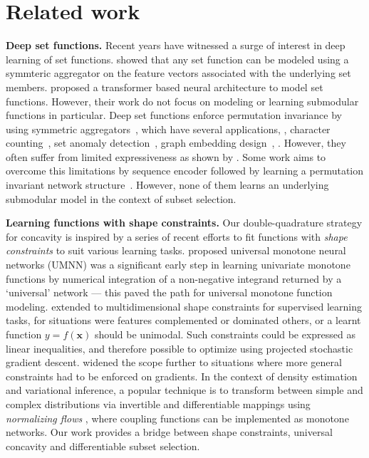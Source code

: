 \documentclass{article}
\newcommand{\xhdr}[1]{\noindent\textbf{#1.}}
\renewcommand{\cite}{\citep}
\begin{document}
% 
% 

\section{Related work}

\xhdr{Deep set functions} 
Recent years have witnessed a surge of interest in deep learning of set functions.  \citet{zaheer2017deep} showed that any set function can be modeled using a symmteric aggregator on the feature vectors associated with the underlying set members. \citet{lee2019set} proposed a transformer based neural architecture to model set functions. However, their work do not focus on modeling or learning submodular functions in particular. Deep set functions enforce permutation invariance by using symmetric aggregators~\cite{zaheer2017deep, ravanbakhsh2016deep, qi2017pointnet}, which have several applications, \eg, character counting~\cite{lee2019set}, set anomaly detection~\cite{lee2019set}, graph embedding design~\cite{hamilton2017inductive, kipf2016semi,verma2022varscene,samanta2020nevae}, \etc. However, they often suffer from limited expressiveness as shown by \citet{pmlr-v97-wagstaff19a}.  Some work aims to overcome this limitations by sequence encoder followed by learning a permutation invariant network structure~\cite{prateek, permgnn}.  However, none of them learns an underlying submodular model in the context of subset selection.


\xhdr{Learning functions with shape constraints}
Our double-quadrature strategy for concavity is inspired by a series of recent efforts to fit functions with \emph{shape constraints} to suit various learning tasks.
\citet{umnn} proposed universal monotone neural networks (UMNN) was a significant early step in learning univariate monotone functions by numerical integration of a non-negative integrand returned by a `universal' network --- this paved the path for universal monotone function modeling.
\citet{Gupta2020MultiShape} extended to multidimensional shape constraints for supervised learning tasks, for situations were features complemented or dominated others, or a learnt function $y=f(\bm{x})$ should be unimodal.  Such constraints could be expressed as linear inequalities, and therefore possible to optimize using projected stochastic gradient descent.
\citet{Gupta2021PenDerShape} widened the scope further to situations where more general constraints had to be enforced on gradients.
In the context of density estimation and variational inference, a popular technique is to transform between simple and complex distributions via invertible and differentiable mappings using \emph{normalizing flows} \citep{Kobyzev2021NormalizingFlows}, where coupling functions can be implemented as monotone networks.
Our work provides a bridge between shape constraints, universal concavity and differentiable subset selection.
\end{document}
